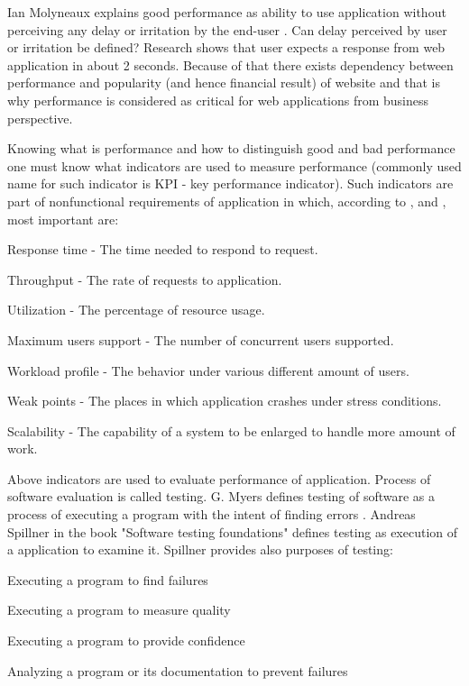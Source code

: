 \documentclass[12pt,a4paper]{article}
\let\tempone\itemize
\let\temptwo\enditemize
\renewenvironment{itemize}{\tempone\addtolength{\itemsep}{-0.4\baselineskip}}{\temptwo}
\begin{document}
Ian Molyneaux explains good performance as ability to use application without perceiving any delay or irritation by the end-user \cite{artperformance}. Can delay perceived by user or irritation be defined? Research \cite{howlong} shows that user expects a response from web application in about 2 seconds. Because of that there exists dependency between performance and popularity (and hence financial result) of website and that is why performance is  considered as critical for web applications from business perspective\cite{architectingperformance}. 

Knowing what is performance and how to distinguish good and bad performance one must know what indicators are used to measure performance (commonly used name for such indicator is KPI - key performance indicator). Such indicators are part of nonfunctional requirements of application in which, according to \cite{artperformance}, \cite{analysisofpet} and \cite{petmethodsandtools},  most important are:  
\begin{itemize}
\item Response time - The time needed to respond to request.
\item Throughput - The rate of requests to application.
\item Utilization - The percentage of resource usage.
\item Maximum users support - The number of concurrent users supported.
\item Workload profile - The behavior under various different amount of users.
\item Weak points - The places in which application crashes under stress conditions.
\item Scalability - The capability of a system to be enlarged to handle more amount of work.
\end{itemize}

Above indicators are used to evaluate performance of application. Process of software evaluation is called testing. G. Myers defines testing of software as a process of executing a program with the intent of finding errors \cite{arttest}. Andreas Spillner in the book "Software testing foundations" \cite{testfoundations} defines testing as execution of a application to examine it. Spillner provides also purposes of testing: 
\begin{itemize}
\item Executing a program to find failures
\item Executing a program to measure quality
\item Executing a program to provide confidence 
\item Analyzing a program or its documentation to prevent failures
\end{itemize}
\end{document}
